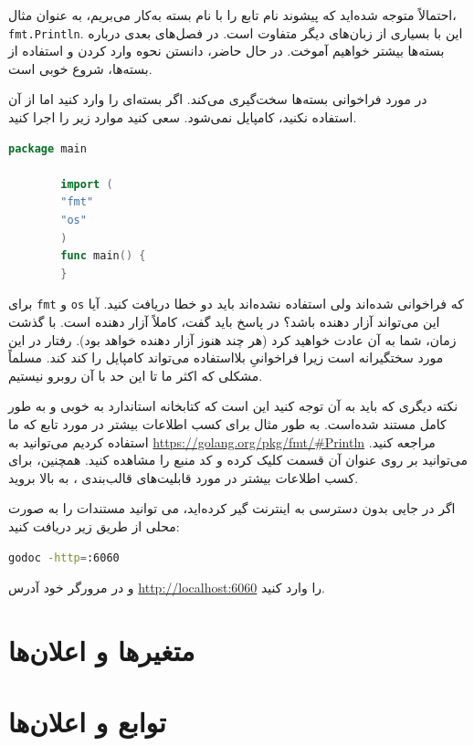 \documentclass{book}
\begin{document}
احتمالاً متوجه شده‌اید که پیشوند نام تابع را با نام بسته به‌کار می‌بریم، به عنوان مثال، \verb*|fmt.Println|. این با بسیاری از زبان‌های دیگر متفاوت است. در فصل‌های بعدی درباره بسته‌ها بیشتر خواهیم آموخت. در حال حاضر، دانستن نحوه وارد کردن و استفاده از بسته‌ها، شروع خوبی است.

در مورد فراخوانی بسته‌ها سخت‌گیری می‌کند. اگر بسته‌ای را وارد کنید اما از آن استفاده نکنید، کامپایل نمی‌شود. سعی کنید موارد زیر را اجرا کنید.

\begin{latin}
	\begin{lstlisting}[language=Go]
		package main
		
		import (
		"fmt"
		"os"
		)
		func main() {
		}
	\end{lstlisting}
\end{latin}
برای \verb*|fmt| و \verb*|os| که فراخوانی شده‌اند ولی استفاده نشده‌اند باید دو خطا دریافت کنید. آیا این می‌تواند آزار دهنده باشد؟ در  پاسخ باید گفت، کاملاً  آزار دهنده است. با گذشت زمان، شما به آن عادت خواهید کرد (هر چند هنوز آزار دهنده خواهد بود).
رفتار  
 در این مورد سختگیرانه است زیرا فراخوانیِ بلااستفاده می‌تواند کامپایل را کند کند. مسلماً مشکلی که اکثر ما تا این حد با آن روبرو نیستیم. 
 
 نکته دیگری که باید به آن توجه کنید این است که کتابخانه استاندارد  به خوبی و به طور کامل مستند شده‌است. به طور مثال برای کسب اطلاعات بیشتر در مورد تابع  که ما استفاده کردیم می‌توانید به \url{https://golang.org/pkg/fmt/#Println} مراجعه کنید. می‌توانید بر روی عنوان آن قسمت کلیک کرده و کد منبع را مشاهده کنید. همچنین، برای کسب اطلاعات بیشتر در مورد قابلیت‌های قالب‌بندی ، به بالا بروید.
 
اگر در جایی بدون دسترسی به اینترنت گیر کرده‌اید، می توانید مستندات را به صورت محلی از طریق زیر دریافت کنید:
\begin{latin}
	\begin{lstlisting}[language=bash]
	godoc -http=:6060
	\end{lstlisting}
\end{latin}
و  در مرورگر خود آدرس  \url{http://localhost:6060} را وارد کنید.
 
\newpage
\section{متغیرها و اعلان‌ها}

\newpage
\section{توابع و اعلان‌ها}
\end{document}
